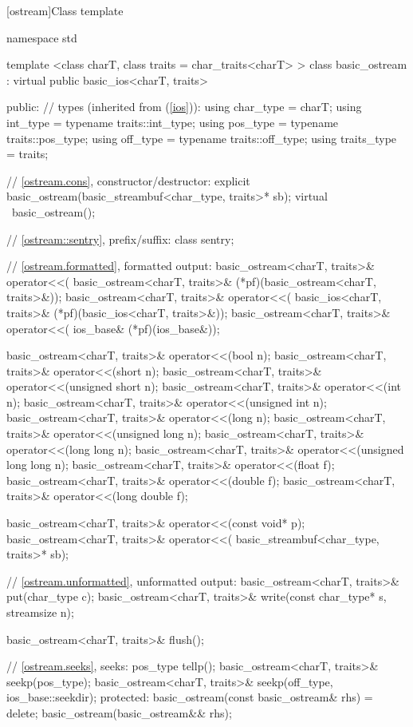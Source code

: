 [ostream]{Class template }
\begin{codeblock}
namespace std {
  template <class charT, class traits = char_traits<charT> >
  class basic_ostream
    : virtual public basic_ios<charT, traits> {
  public:
    // types (inherited from  (\ref{ios})):
    using char_type   = charT;
    using int_type    = typename traits::int_type;
    using pos_type    = typename traits::pos_type;
    using off_type    = typename traits::off_type;
    using traits_type = traits;

    // \ref{ostream.cons}, constructor/destructor:
    explicit basic_ostream(basic_streambuf<char_type, traits>* sb);
    virtual ~basic_ostream();

    // \ref{ostream::sentry}, prefix/suffix:
    class sentry;

    // \ref{ostream.formatted}, formatted output:
    basic_ostream<charT, traits>& operator<<(
      basic_ostream<charT, traits>& (*pf)(basic_ostream<charT, traits>&));
    basic_ostream<charT, traits>& operator<<(
      basic_ios<charT, traits>& (*pf)(basic_ios<charT, traits>&));
    basic_ostream<charT, traits>& operator<<(
      ios_base& (*pf)(ios_base&));

    basic_ostream<charT, traits>& operator<<(bool n);
    basic_ostream<charT, traits>& operator<<(short n);
    basic_ostream<charT, traits>& operator<<(unsigned short n);
    basic_ostream<charT, traits>& operator<<(int n);
    basic_ostream<charT, traits>& operator<<(unsigned int n);
    basic_ostream<charT, traits>& operator<<(long n);
    basic_ostream<charT, traits>& operator<<(unsigned long n);
    basic_ostream<charT, traits>& operator<<(long long n);
    basic_ostream<charT, traits>& operator<<(unsigned long long n);
    basic_ostream<charT, traits>& operator<<(float f);
    basic_ostream<charT, traits>& operator<<(double f);
    basic_ostream<charT, traits>& operator<<(long double f);

    basic_ostream<charT, traits>& operator<<(const void* p);
    basic_ostream<charT, traits>& operator<<(
      basic_streambuf<char_type, traits>* sb);

    // \ref{ostream.unformatted}, unformatted output:
    basic_ostream<charT, traits>& put(char_type c);
    basic_ostream<charT, traits>& write(const char_type* s, streamsize n);

    basic_ostream<charT, traits>& flush();

    // \ref{ostream.seeks}, seeks:
    pos_type tellp();
    basic_ostream<charT, traits>& seekp(pos_type);
    basic_ostream<charT, traits>& seekp(off_type, ios_base::seekdir);
  protected:
    basic_ostream(const basic_ostream& rhs) = delete;
    basic_ostream(basic_ostream&& rhs);

}}
\end{codeblock}
